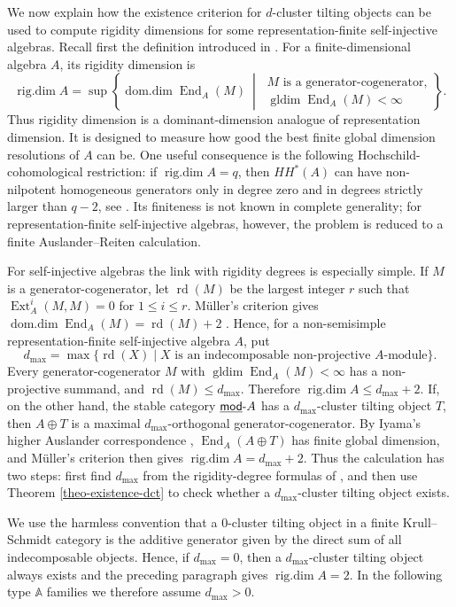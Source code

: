 \documentclass[12pt]{article}
\theoremstyle{plain}
\theoremstyle{definition}
\DeclareMathOperator{\gldim}{gldim}
\DeclareMathOperator{\Ext}{Ext}
\DeclareMathOperator{\End}{End}
\DeclareMathOperator{\domdim}{dom.dim}
\DeclareMathOperator{\rigdim}{rig.dim}
\DeclareMathOperator{\rd}{rd}
\def\stmodcat#1{\underline{\sf mod}\mbox{-}{#1}}
\renewcommand{\leq}{\leqslant}
\begin{document}
We now explain how the existence criterion for \(d\)-cluster tilting objects
can be used to compute rigidity dimensions for some representation-finite
self-injective algebras.  Recall first the definition introduced in
\cite{ChenFangKernerKoenigYamagata2021}.  For a finite-dimensional algebra
\(A\), its rigidity dimension is
\[
\rigdim A=\sup\left\{\domdim \End_A(M)\ \middle|\
\begin{array}{l}
M\text{ is a generator-cogenerator,}\\
\gldim\End_A(M)<\infty
\end{array}\right\}.
\]
Thus rigidity dimension is a dominant-dimension analogue of representation
dimension.  It is designed to measure how good the best finite global
dimension resolutions of \(A\) can be.  One useful consequence is the
following Hochschild-cohomological restriction: if \(\rigdim A=q\), then
\(HH^*(A)\) can have non-nilpotent homogeneous generators only in degree zero
and in degrees strictly larger than \(q-2\), see
\cite{ChenFangKernerKoenigYamagata2021}.  Its finiteness is not known in
complete generality; for representation-finite self-injective algebras,
however, the problem is reduced to a finite Auslander--Reiten calculation.

For self-injective algebras the link with rigidity degrees is especially
simple.  If \(M\) is a generator-cogenerator, let \(\rd(M)\) be the largest
integer \(r\) such that \(\Ext_A^i(M,M)=0\) for \(1\leq i\leq r\).  M\"uller's
criterion gives \(\domdim\End_A(M)=\rd(M)+2\) \cite{Muller1968ab}.  Hence,
for a non-semisimple representation-finite self-injective algebra \(A\), put
\[
d_{\max}=\max\{\rd(X)\mid X\text{ is an indecomposable non-projective }
A\text{-module}\}.
\]
Every generator-cogenerator \(M\) with \(\gldim\End_A(M)<\infty\) has a
non-projective summand, and \(\rd(M)\leq d_{\max}\).  Therefore
\(\rigdim A\leq d_{\max}+2\).  If, on the other hand, the stable category
\(\stmodcat{A}\) has a \(d_{\max}\)-cluster tilting object \(T\), then
\(A\oplus T\) is a maximal \(d_{\max}\)-orthogonal generator-cogenerator.
By Iyama's higher Auslander correspondence \cite{Iyama2007ab},
\(\End_A(A\oplus T)\) has finite global dimension, and M\"uller's criterion
then gives \(\rigdim A=d_{\max}+2\).  Thus the calculation has two steps:
first find \(d_{\max}\) from the rigidity-degree formulas of
\cite{HuYinRigidityDegrees}, and then use Theorem \ref{theo-existence-dct} to
check whether a \(d_{\max}\)-cluster tilting object exists.

We use the harmless convention that a \(0\)-cluster tilting object in a finite
Krull--Schmidt category is the additive generator given by the direct
sum of all indecomposable objects.  Hence, if \(d_{\max}=0\), then a
\(d_{\max}\)-cluster tilting object always exists and the preceding paragraph
gives \(\rigdim A=2\).  In the following type \(\mathbb A\) families we
therefore assume \(d_{\max}>0\).
\end{document}
